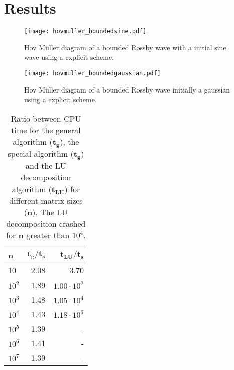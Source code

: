 \section{Results}
\label{sec:results}

\begin{figure}[htbp]
	\centering
	\texttt{[image: hovmuller\_boundedsine.pdf]}
	\caption{Hov Müller diagram of a bounded Rossby wave with a initial sine wave using a explicit scheme.}
	\label{fig:hovmullerSineBounded}
\end{figure}

\begin{figure}[htbp]
	\centering
	\texttt{[image: hovmuller\_boundedgaussian.pdf]}
	\caption{Hov Müller diagram of a bounded Rossby wave initially a gaussian using a explicit scheme.}
	\label{fig:hovmullerGaussianBounded}
\end{figure}


\begin{table}[htbp]
	\centering
	\begin{tabular}{lrr}
		\textbf{n} & $\mathbf{{t_g}/{t_s}}$ & $\mathbf{{t_{LU}}/{t_s}}$  \\
		\midrule
		\addlinespace[0.1cm]

		10         & 2.08                                                                                          & 3.70                                                                                        \\
		$10^2$       & 1.89                                                                                          & $1.00\cdot 10^2 $                                                                                         \\
		$10^3$       & 1.48                                                                                          & $1.05 \cdot 10^4 $                                                                                        \\
		$10^4$       & 1.43                                                                                          & $1.18 \cdot 10^6$                                                                                         \\
		$10^5$       & 1.39                                                                                          & -                                                                                         \\
		$10^6$       & 1.41                                                                                          & -                                                                                        \\
		$10^7$       & 1.39                                                                                          &    -
	\end{tabular}  \caption{Ratio between CPU time for the general algorithm ($\mathbf{t_g}$), the special algorithm ($\mathbf{t_g}$) and the LU decomposition algorithm ($\mathbf{t_{LU}}$) for different matrix sizes (\textbf{n}). The LU decomposition crashed for \textbf{n} greater than $10^4$.} \label{table:time}
\end{table}
